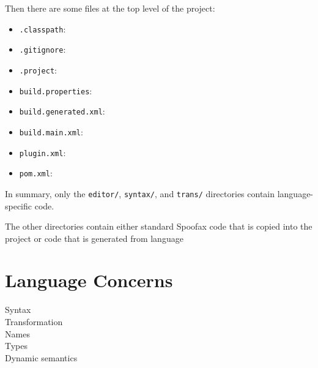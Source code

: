Then there are some files at the top level of the project:

\begin{itemize}
  \item \texttt{.classpath}:
  \item \texttt{.gitignore}:
  \item \texttt{.project}:
  \item \texttt{build.properties}: 
  \item \texttt{build.generated.xml}: 
  \item \texttt{build.main.xml}: 
  \item \texttt{plugin.xml}: 
  \item \texttt{pom.xml}: 
\end{itemize}

In summary, only the \texttt{editor/}, \texttt{syntax/}, and \texttt{trans/}
directories contain language-specific code.


The other directories contain either standard Spoofax code that is copied into
the project or code that is generated from language 

\section{Language Concerns}

\begin{description}
\item[Syntax]
\item[Transformation]
\item[Names]
\item[Types]
\item[Dynamic semantics]
\end{description}


